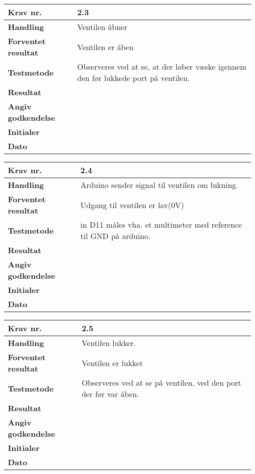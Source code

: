 	\begin{center}
		\begin{longtable}{ | m{4cm}| m{8.5cm}|} 
			\hline
			\textbf{Krav nr.} & 2.3  \\ 
			\hline
			\textbf{Handling} & Ventilen åbner   \\
			\hline
			\textbf{Forventet resultat} & Ventilen er åben \\
			\hline
			\textbf{Testmetode}  & Observeres ved at se, at der løber væske igennem den før lukkede port på ventilen.  \\
			\hline
			\textbf{Resultat}  &    \\
			\hline
			\textbf{Angiv godkendelse} &     \\
			\hline
			\textbf{Initialer} &     \\
			\hline
			\textbf{Dato} &    \\
			\hline
		\end{longtable}
	\end{center}
	
	\begin{center}
		\begin{longtable}{ | m{4cm}| m{8.5cm}|} 
			\hline
			\textbf{Krav nr.} & 2.4  \\ 
			\hline
			\textbf{Handling} & Arduino sender signal til ventilen om lukning.   \\
			\hline
			\textbf{Forventet resultat} & Udgang til ventilen er lav(0V) \\
			\hline
			\textbf{Testmetode}  & in D11 måles vha. et multimeter med reference til GND på arduino.  \\
			\hline
			\textbf{Resultat}  &    \\
			\hline
			\textbf{Angiv godkendelse} &     \\
			\hline
			\textbf{Initialer} &     \\
			\hline
			\textbf{Dato} &    \\
			\hline
		\end{longtable}
	\end{center}	
	
	\begin{center}
		\begin{longtable}{ | m{4cm}| m{8.5cm}|} 
			\hline
			\textbf{Krav nr.} & 2.5  \\ 
			\hline
			\textbf{Handling} & Ventilen lukker. \\
			\hline
			\textbf{Forventet resultat} & Ventilen er lukket \\
			\hline
			\textbf{Testmetode}  & Observeres ved at se på ventilen, ved den port der før var åben.  \\
			\hline
			\textbf{Resultat}  &    \\
			\hline
			\textbf{Angiv godkendelse} &     \\
			\hline
			\textbf{Initialer} &     \\
			\hline
			\textbf{Dato} &    \\
			\hline
		\end{longtable}
	\end{center}